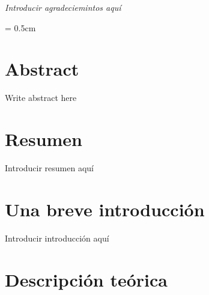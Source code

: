 \documentclass[12pt]{article}
\begin{document}
\newpage
\begin{minipage}[]{20cm}
\vspace{10cm}
\end{minipage}
\newpage

\begin{minipage}[]{20cm}
\vspace{10cm}
\end{minipage}


\begin{flushright}
\normalsize \textit{Introducir agradeciemintos aquí}
\end{flushright}

\newpage

\begin{minipage}[]{20cm}
\vspace{10cm}
\end{minipage}

\newpage

\parskip = 0.5cm
\newpage
\tableofcontents
\newpage
{}	%
\setcounter{page}{1}

\section*{Abstract}
%

\normalsize Write abstract here

\vspace{0.5cm}

\section*{Resumen}

\normalsize Introducir resumen aquí

\newpage

\section*{Una breve introducción}
%

\normalsize Introducir introducción aquí

\newpage


\section{Descripción teórica}
\end{document}
